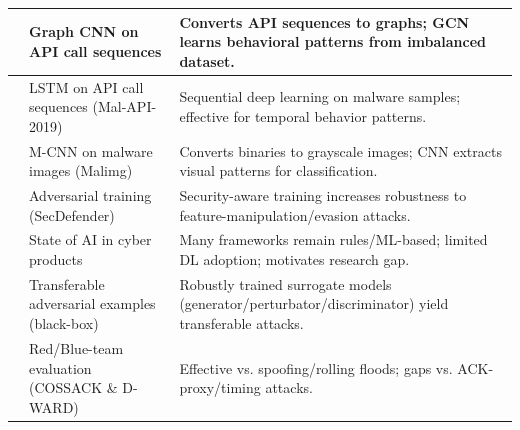 \begin{longtable}{|M{2cm}|M{3.5cm}|M{7cm}|}
\textcite{Oliveira2019} & Graph CNN on API call sequences & Converts API sequences to graphs; GCN learns behavioral patterns from imbalanced dataset. \\\hline
\textcite{Catak2020} & LSTM on API call sequences (Mal-API-2019) & Sequential deep learning on malware samples; effective for temporal behavior patterns. \\\hline
\textcite{Kalash2018} & M-CNN on malware images (Malimg) & Converts binaries to grayscale images; CNN extracts visual patterns for classification. \\\hline
\textcite{Chen} & Adversarial training (SecDefender) & Security-aware training increases robustness to feature-manipulation/evasion attacks. \\\hline
\textcite{Applebaum} & State of AI in cyber products & Many frameworks remain rules/ML-based; limited DL adoption; motivates research gap. \\\hline
\textcite{Shi} & Transferable adversarial examples (black-box) & Robustly trained surrogate models (generator/perturbator/discriminator) yield transferable attacks. \\\hline
\textcite{Mirkovic} & Red/Blue-team evaluation (COSSACK \& D-WARD) & Effective vs. spoofing/rolling floods; gaps vs. ACK-proxy/timing attacks. \\\hline
\end{longtable}
